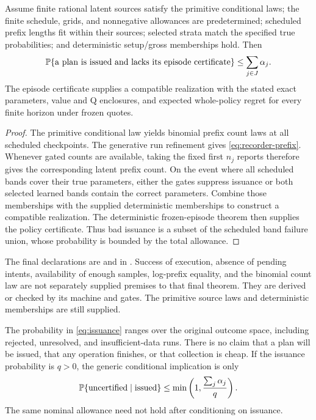 \begin{theorem}
Assume finite rational latent sources satisfy the primitive conditional laws;
the finite schedule, grids, and nonnegative allowances are predetermined;
scheduled prefix lengths fit within their sources; selected strata match the
specified true probabilities; and deterministic setup/gross memberships hold.
Then
\begin{equation}
 \mathbb P\{\text{a plan is issued and lacks its episode certificate}\}
 \leq \sum_{j\in J}\alpha_j.
 \label{eq:issuance}
\end{equation}
The episode certificate supplies a compatible realization with the stated exact
parameters, value and Q enclosures, and expected whole-policy regret for every
finite horizon under frozen quotes.
\end{theorem}
\begin{proof}
The primitive conditional law yields binomial prefix count laws at all scheduled
checkpoints. The generative run refinement gives \eqref{eq:recorder-prefix}.
Whenever gated counts are available, taking the fixed first $n_j$ reports
therefore gives the corresponding latent prefix count. On the event where all
scheduled bands cover their true parameters, either the gates suppress issuance
or both selected learned bands contain the correct parameters. Combine those
memberships with the supplied deterministic memberships to construct a
compatible realization. The deterministic frozen-episode theorem then supplies
the policy certificate. Thus bad issuance is a subset of the scheduled band
failure union, whose probability is bounded by the total allowance.
\end{proof}

The final declarations are  and
 in
. Success of execution, absence of pending
intents, availability of enough samples, log-prefix equality, and the binomial
count law are not separately supplied premises to that final theorem. They are
derived or checked by its machine and gates. The primitive source laws and
deterministic memberships are still supplied.

The probability in \eqref{eq:issuance} ranges over the original outcome space,
including rejected, unresolved, and insufficient-data runs. There is no claim
that a plan will be issued, that any operation finishes, or that collection is
cheap. If the issuance probability is $q>0$, the generic conditional implication
is only
\[
 \mathbb P\{\text{uncertified}\mid\text{issued}\}
 \leq \min\left(1,\frac{\sum_j\alpha_j}{q}\right).
\]
The same nominal allowance need not hold after conditioning on issuance.

